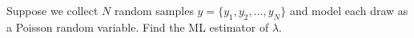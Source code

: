 \documentclass[border=3bp]{standalone}
\begin{document}
\begin{minipage}{4in}
Suppose we collect $N$ random samples $y = \{y_1, y_2, ..., y_N\}$ and model each draw as a Poisson random variable. Find the ML estimator of $\lambda$.
\end{minipage}
\end{document}
